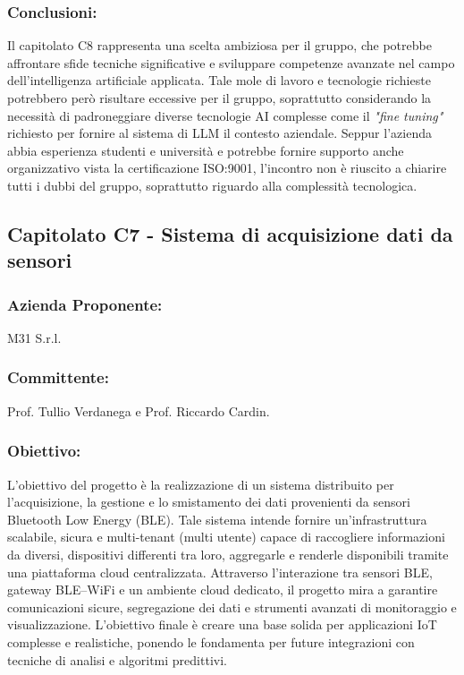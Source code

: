 \documentclass[a4paper,12pt]{article}
\begin{document}
\subsubsection*{Conclusioni:}
Il capitolato C8 rappresenta una scelta ambiziosa per il gruppo, che potrebbe affrontare sfide tecniche significative e sviluppare competenze avanzate nel campo dell'intelligenza artificiale applicata.
Tale mole di lavoro e tecnologie richieste potrebbero però risultare eccessive per il gruppo, soprattutto considerando la necessità di padroneggiare diverse tecnologie AI complesse come il \textit{"fine tuning"} richiesto per fornire al sistema di LLM il contesto aziendale. 
Seppur l'azienda abbia esperienza studenti e università e potrebbe fornire supporto anche organizzativo vista la certificazione ISO:9001, l'incontro non è riuscito a chiarire tutti i dubbi del gruppo, soprattutto riguardo alla complessità tecnologica.
\vspace{2.0cm}

\subsection{ Capitolato C7 - Sistema di acquisizione dati da sensori}
\subsubsection*{Azienda Proponente:} M31 S.r.l.
\subsubsection*{Committente:} Prof. Tullio Verdanega e Prof. Riccardo Cardin.
\subsubsection*{Obiettivo:} 
L’obiettivo del progetto è la realizzazione di un sistema distribuito per l’acquisizione, la gestione e lo smistamento dei dati provenienti da sensori Bluetooth Low Energy (BLE). Tale sistema intende fornire un’infrastruttura scalabile, sicura e multi-tenant (multi utente) capace di raccogliere informazioni da diversi, dispositivi differenti tra loro, aggregarle e renderle disponibili tramite una piattaforma cloud centralizzata.
Attraverso l’interazione tra sensori BLE, gateway BLE–WiFi e un ambiente cloud dedicato, il progetto mira a garantire comunicazioni sicure, segregazione dei dati e strumenti avanzati di monitoraggio e visualizzazione. L’obiettivo finale è creare una base solida per applicazioni IoT complesse e realistiche, ponendo le fondamenta per future integrazioni con tecniche di analisi e algoritmi predittivi.
\end{document}
